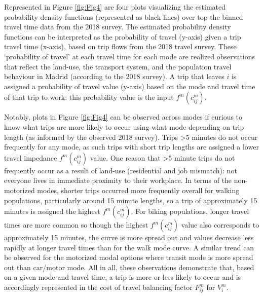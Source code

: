 \documentclass[10pt,letterpaper]{article}
\begin{document}
Represented in Figure \ref{fig:Fig4} are four plots visualizing the
estimated probability density functions (represented as black lines)
over top the binned travel time data from the 2018 survey. The estimated
probability density functions can be interpreted as the probability of
travel (y-axis) given a trip travel time (x-axis), based on trip flows
from the 2018 travel survey. These `probability of travel' at each
travel time for each mode are realized observations that reflect the
land-use, the transport system, and the population travel behaviour in
Madrid (according to the 2018 survey). A trip that leaves \(i\) is
assigned a probability of travel value (y-axis) based on the mode and
travel time of that trip to work: this probability value is the input
\(f^m(c_{ij}^m)\).

Notably, plots in Figure \ref{fig:Fig4} can be observed across modes if
curious to know what trips are more likely to occur using what mode
depending on trip length (as informed by the observed 2018 survey).
Trips \textgreater5 minutes do not occur frequently for any mode, as
such trips with short trip lengths are assigned a lower travel impedance
\(f^m(c_{ij}^m)\) value. One reason that \textgreater5 minute trips do
not frequently occur as a result of land-use (residential and job
mismatch): not everyone lives in immediate proximity to their workplace.
In terms of the non-motorized modes, shorter trips occurred more
frequently overall for walking populations, particularly around 15
minute lengths, so a trip of approximately 15 minutes is assigned the
highest \(f^m(c_{ij}^m)\). For biking populations, longer travel times
are more common so though the highest \(f^m(c_{ij}^m)\) value also
corresponds to approximately 15 minutes, the curve is more spread out
and values decrease less rapidly at longer travel times than for the
walk mode curve. A similar trend can be observed for the motorized modal
options where transit mode is more spread out than car/motor mode. All
in all, these observations demonstrate that, based on a given mode and
travel time, a trip is more or less likely to occur and is accordingly
represented in the cost of travel balancing factor \(F_{ij}^m\) for
\(V_i^m\).
\end{document}
